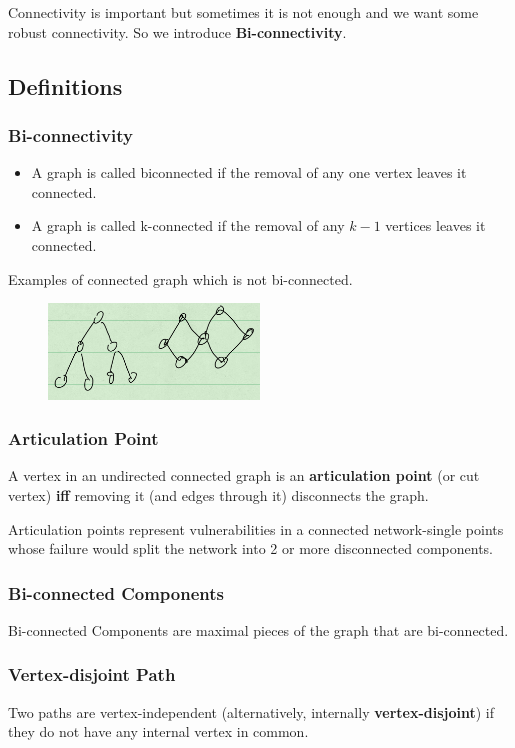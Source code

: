 
Connectivity is important but sometimes it is not enough and we want some 
robust connectivity. So we introduce \textbf{Bi-connectivity}.
\subsection{Definitions}
\subsubsection{Bi-connectivity}
\begin{itemize}
\item A graph is called biconnected if the removal of any one vertex leaves it 
connected.
\item A graph is called k-connected if the removal of any $k-1$ vertices leaves 
it connected.
\end{itemize}
Examples of connected graph which is not bi-connected.
\begin{figure}[H]
\centering
\includegraphics[width=0.5\textwidth]{bi-connectivity.png}
\end{figure}
\subsubsection{Articulation Point}
A vertex in an undirected connected graph is an \textbf{articulation point} (or 
cut vertex) \textbf{iff} removing it (and edges through it) disconnects the 
graph. 

Articulation points represent vulnerabilities in a connected 
network-single points whose failure would split the network into 2 or more 
disconnected components.

\subsubsection{Bi-connected Components}
Bi-connected Components are maximal pieces of the graph that are bi-connected.

\subsubsection{Vertex-disjoint Path}
Two paths are vertex-independent (alternatively, internally 
\textbf{vertex-disjoint}) if they do not have any internal vertex in common. 

